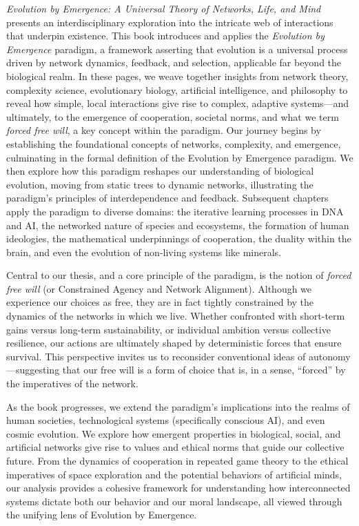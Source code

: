\documentclass[12pt,openany]{book}
\begin{document}
\textit{Evolution by Emergence: A Universal Theory of Networks, Life, and Mind} presents an interdisciplinary exploration into the intricate web of interactions that underpin existence. This book introduces and applies the \emph{Evolution by Emergence} paradigm, a framework asserting that evolution is a universal process driven by network dynamics, feedback, and selection, applicable far beyond the biological realm. In these pages, we weave together insights from network theory, complexity science, evolutionary biology, artificial intelligence, and philosophy to reveal how simple, local interactions give rise to complex, adaptive systems—and ultimately, to the emergence of cooperation, societal norms, and what we term \emph{forced free will}, a key concept within the paradigm. %
%
Our journey begins by establishing the foundational concepts of networks, complexity, and emergence, culminating in the formal definition of the Evolution by Emergence paradigm. We then explore how this paradigm reshapes our understanding of biological evolution, moving from static trees to dynamic networks, illustrating the paradigm's principles of interdependence and feedback. Subsequent chapters apply the paradigm to diverse domains: the iterative learning processes in DNA and AI, the networked nature of species and ecosystems, the formation of human ideologies, the mathematical underpinnings of cooperation, the duality within the brain, and even the evolution of non-living systems like minerals. %

Central to our thesis, and a core principle of the paradigm, is the notion of \emph{forced free will} (or Constrained Agency and Network Alignment). Although we experience our choices as free, they are in fact tightly constrained by the dynamics of the networks in which we live. Whether confronted with short-term gains versus long-term sustainability, or individual ambition versus collective resilience, our actions are ultimately shaped by deterministic forces that ensure survival. This perspective invites us to reconsider conventional ideas of autonomy—suggesting that our free will is a form of choice that is, in a sense, “forced” by the imperatives of the network.

As the book progresses, we extend the paradigm's implications into the realms of human societies, technological systems (specifically conscious AI), and even cosmic evolution. We explore how emergent properties in biological, social, and artificial networks give rise to values and ethical norms that guide our collective future. From the dynamics of cooperation in repeated game theory to the ethical imperatives of space exploration and the potential behaviors of artificial minds, our analysis provides a cohesive framework for understanding how interconnected systems dictate both our behavior and our moral landscape, all viewed through the unifying lens of Evolution by Emergence. %
\end{document}
